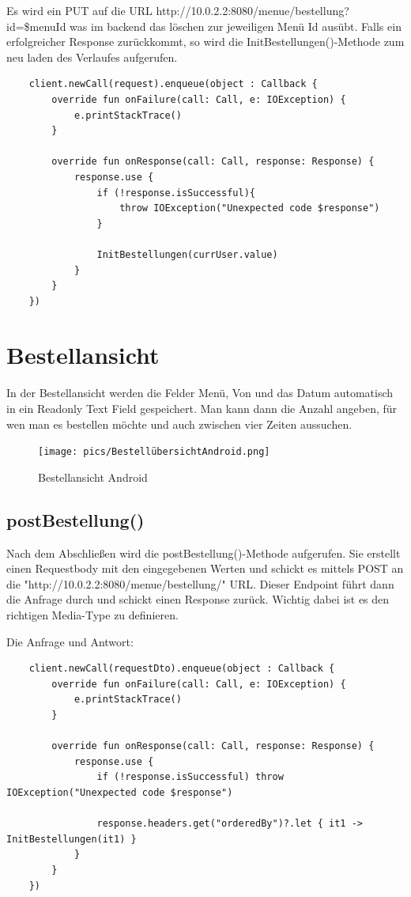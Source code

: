 Es wird ein PUT auf die URL http://10.0.2.2:8080/menue/bestellung?id=\$menuId was im backend das löschen zur jeweiligen Menü Id ausübt.
Falls ein erfolgreicher Response zurückkommt, so wird die InitBestellungen()-Methode zum neu laden des Verlaufes aufgerufen.

\begin{lstlisting}
    client.newCall(request).enqueue(object : Callback {
        override fun onFailure(call: Call, e: IOException) {
            e.printStackTrace()
        }

        override fun onResponse(call: Call, response: Response) {
            response.use {
                if (!response.isSuccessful){
                    throw IOException("Unexpected code $response")
                }

                InitBestellungen(currUser.value)
            }
        }
    })
\end{lstlisting}


\pagebreak


\section{Bestellansicht}

In der Bestellansicht werden die Felder Menü, Von und das Datum automatisch in ein Readonly Text Field gespeichert.
Man kann dann die Anzahl angeben, für wen man es bestellen möchte und auch zwischen vier Zeiten aussuchen. 

\begin{figure}[htp]
    \centering
    \author{Bozidar Spasenovic}
    \texttt{[image: pics/BestellübersichtAndroid.png]}
    \caption{Bestellansicht Android}
    \label{fig:impl:BestellübersichtAndroid}
\end{figure}

\subsection{postBestellung()}
Nach dem Abschließen wird die postBestellung()-Methode aufgerufen. Sie erstellt einen Requestbody mit den eingegebenen Werten
und schickt es mittels POST an die "http://10.0.2.2:8080/menue/bestellung/" URL. Dieser Endpoint führt dann die Anfrage durch und schickt einen Response zurück.
Wichtig dabei ist es den richtigen Media-Type zu definieren. 

Die Anfrage und Antwort:
\begin{lstlisting}
    client.newCall(requestDto).enqueue(object : Callback {
        override fun onFailure(call: Call, e: IOException) {
            e.printStackTrace()
        }

        override fun onResponse(call: Call, response: Response) {
            response.use {
                if (!response.isSuccessful) throw IOException("Unexpected code $response")

                response.headers.get("orderedBy")?.let { it1 -> InitBestellungen(it1) }
            }
        }
    })
\end{lstlisting}


